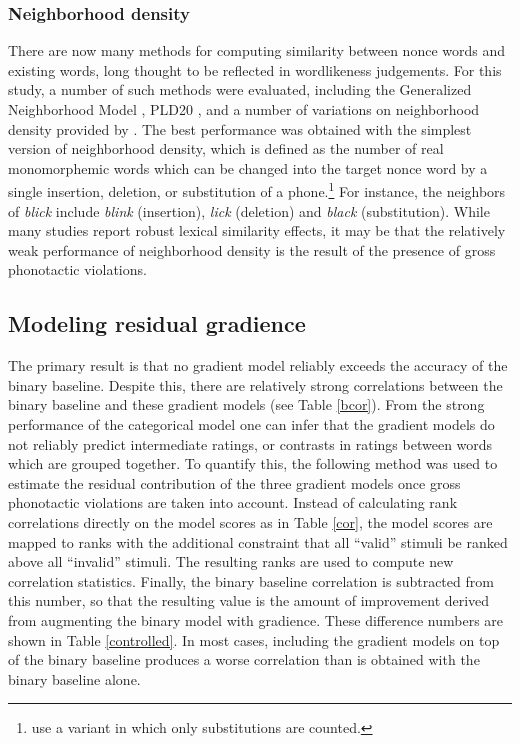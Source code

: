 \subsubsection{Neighborhood density} 
\label{density}

There are now many methods for computing similarity between nonce words and existing words, long thought to be reflected in wordlikeness judgements. 
For this study, a number of such methods were evaluated, including the Generalized Neighborhood Model \citep{Bailey2001}, PLD20 \citep{Suarez2011}, and a number of variations on neighborhood density \citep{Coltheart1977} provided by \citet{Vaden2009}. The best performance was obtained with the simplest version of neighborhood density, which is defined as the number of real monomorphemic words which can be changed into the target nonce word by a single insertion, deletion, or substitution of a phone.\footnote{\citet{Greenberg1964} use a variant in which only substitutions are counted.} For instance, the neighbors of \emph{blick} include \emph{blink} (insertion), \emph{lick} (deletion) and \emph{black} (substitution). While many studies \citep[e.g.,][]{Bailey2001} report robust lexical similarity effects, it may be that the relatively weak performance of neighborhood density is the result of the presence of gross phonotactic violations.

\subsection{Modeling residual gradience}

The primary result is that no gradient model reliably exceeds the accuracy of the binary baseline. Despite this, there are relatively strong correlations between the binary baseline and these gradient models (see Table \ref{bcor}). From the strong performance of the categorical model one can infer that the gradient models do not reliably predict intermediate ratings, or contrasts in ratings between words which are grouped together. To quantify this, the following method was used to estimate the residual contribution of the three gradient models once gross phonotactic violations are taken into account. Instead of calculating rank correlations directly on the model scores as in Table \ref{cor}, the model scores are mapped to ranks with the additional constraint that all ``valid'' stimuli be ranked above all ``invalid'' stimuli. The resulting ranks are used to compute new correlation statistics. Finally, the binary baseline correlation is subtracted from this number, so that the resulting value is the amount of improvement derived from augmenting the binary model with gradience. These difference numbers are shown in Table \ref{controlled}. In most cases, including the gradient models on top of the binary baseline produces a worse correlation than is obtained with the binary baseline alone.

